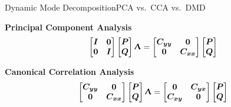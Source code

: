 \begin{frame}[t, c]{Dynamic Mode Decomposition}{PCA vs.\ CCA vs.\ DMD}
  \begin{block}{\centering \textbf{Principal Component Analysis}}
    $$
    \begin{bmatrix}
      \bm{I} & \bm{0} \\
      \bm{0} & \bm{I}
    \end{bmatrix}
    \begin{bmatrix}
      \bm{P} \\
      \bm{Q}
    \end{bmatrix}
    \boldsymbol{\Uplambda}
    =
    \begin{bmatrix}
      \bm{C}_{\bm{yy}} & \bm{0} \\
      \bm{0} & \bm{C}_{\bm{xx}}
    \end{bmatrix}
    \begin{bmatrix}
      \bm{P} \\
      \bm{Q}
    \end{bmatrix}    
    $$
  \end{block}

  \medskip

  \begin{block}{\centering \textbf{Canonical Correlation Analysis}}
    $$
    \begin{bmatrix}
      \bm{C}_{\bm{yy}} & \bm{0} \\
      \bm{0} & \bm{C}_{\bm{xx}}
    \end{bmatrix}
    \begin{bmatrix}
      \bm{P} \\
      \bm{Q}
    \end{bmatrix}
    \boldsymbol{\Uplambda}
    =
    \begin{bmatrix}
      \bm{0} & \bm{C}_{\bm{yx}} \\
      \bm{C}_{\bm{xy}} & \bm{0}
    \end{bmatrix}
    \begin{bmatrix}
      \bm{P} \\
      \bm{Q}
    \end{bmatrix}    
    $$
  \end{block}

  \medskip


\end{frame}
